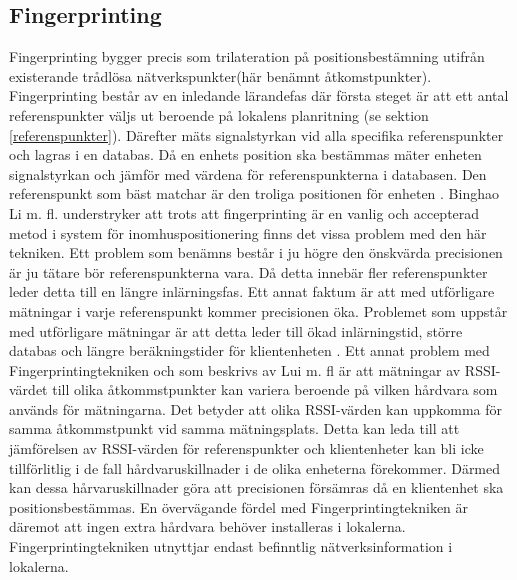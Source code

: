 \documentclass[swedish, a4paper,12pt]{article}
\begin{document}
\subsection{Fingerprinting}\label{fingerprinting}
Fingerprinting bygger precis som trilateration på positionsbestämning utifrån existerande trådlösa nätverkspunkter(här benämnt åtkomstpunkter). Fingerprinting består av en inledande lärandefas där första steget är att ett antal referenspunkter väljs ut beroende på lokalens planritning (se sektion \ref{referenspunkter}). Därefter mäts signalstyrkan vid alla specifika referenspunkter och lagras i en databas. %
Då en enhets position ska bestämmas mäter enheten signalstyrkan och jämför med värdena för referenspunkterna i databasen. Den referenspunkt som bäst matchar är den troliga positionen för enheten \cite{IP1}\cite{jun2018low}.
Binghao Li m. fl. understryker att trots att fingerprinting är en vanlig och accepterad metod i system för inomhuspositionering finns det vissa problem med den här tekniken\cite{IP1}.
Ett problem som benämns består i ju högre den önskvärda precisionen är ju tätare bör referenspunkterna vara. Då detta innebär fler referenspunkter leder detta till en längre inlärningsfas. Ett annat faktum är att med utförligare mätningar i varje referenspunkt kommer precisionen öka. Problemet som uppstår med utförligare mätningar är att detta leder till ökad inlärningstid, större databas och längre beräkningstider för klientenheten \cite{IP1}. Ett annat problem med Fingerprintingtekniken och som beskrivs av Lui m. fl \cite{problem_with_RSSI} är att mätningar av RSSI-värdet till olika åtkommstpunkter kan variera beroende på vilken hårdvara som används för mätningarna. Det betyder att olika RSSI-värden kan uppkomma för samma åtkommstpunkt vid samma mätningsplats. Detta kan leda till att jämförelsen av RSSI-värden för referenspunkter och klientenheter kan bli icke tillförlitlig i de fall hårdvaruskillnader i de olika enheterna förekommer. Därmed kan dessa hårvaruskillnader göra att precisionen försämras då en klientenhet ska positionsbestämmas\cite{problem_with_RSSI}. En övervägande fördel med Fingerprintingtekniken är däremot att ingen extra hårdvara behöver installeras i lokalerna. Fingerprintingtekniken utnyttjar endast befinntlig nätverksinformation i lokalerna.
\end{document}
